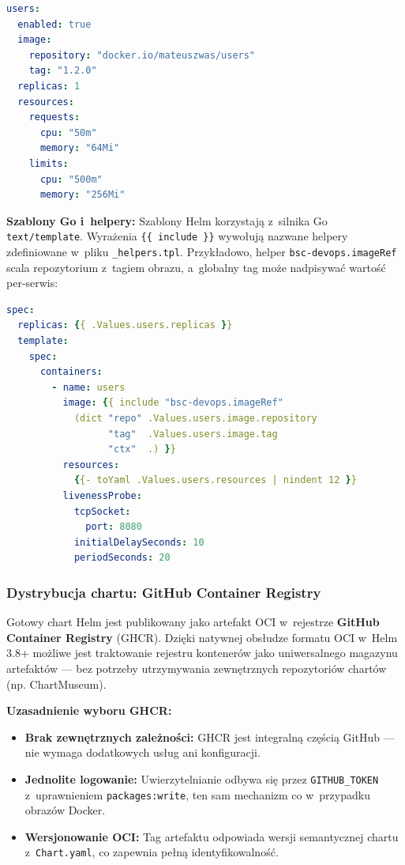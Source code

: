 \begin{lstlisting}[language=yaml, caption={Fragment \texttt{values.yaml} umbrella chartu --- parametryzacja serwisu \textit{users} (infrastructure/helm/bsc-devops/values.yaml)}, label={lst:helm-values}]
users:
  enabled: true
  image:
    repository: "docker.io/mateuszwas/users"
    tag: "1.2.0"
  replicas: 1
  resources:
    requests:
      cpu: "50m"
      memory: "64Mi"
    limits:
      cpu: "500m"
      memory: "256Mi"
\end{lstlisting}

\textbf{Szablony Go i~helpery:}
Szablony Helm korzystają z~silnika Go \texttt{text/template}. Wyrażenia \texttt{\{\{ include \}\}} wywołują nazwane helpery zdefiniowane w~pliku \texttt{\_helpers.tpl}. Przykładowo, helper \texttt{bsc-devops.imageRef} scala repozytorium z~tagiem obrazu, a~globalny tag może nadpisywać wartość per-serwis:

\begin{lstlisting}[language=yaml, caption={Fragment szablonu Deployment serwisu \textit{users} z~interpolacją wartości (infrastructure/helm/bsc-devops/templates/users.yaml)}, label={lst:helm-template}]
spec:
  replicas: {{ .Values.users.replicas }}
  template:
    spec:
      containers:
        - name: users
          image: {{ include "bsc-devops.imageRef"
            (dict "repo" .Values.users.image.repository
                  "tag"  .Values.users.image.tag
                  "ctx"  .) }}
          resources:
            {{- toYaml .Values.users.resources | nindent 12 }}
          livenessProbe:
            tcpSocket:
              port: 8080
            initialDelaySeconds: 10
            periodSeconds: 20
\end{lstlisting}

\subsubsection{Dystrybucja chartu: GitHub Container Registry}
Gotowy chart Helm jest publikowany jako artefakt OCI w~rejestrze \textbf{GitHub Container Registry} (GHCR). Dzięki natywnej obsłudze formatu OCI w~Helm 3.8+ możliwe jest traktowanie rejestru kontenerów jako uniwersalnego magazynu artefaktów --- bez potrzeby utrzymywania zewnętrznych repozytoriów chartów (np. ChartMuseum).

\textbf{Uzasadnienie wyboru GHCR:}
\begin{itemize}
    \item \textbf{Brak zewnętrznych zależności:} GHCR jest integralną częścią GitHub --- nie wymaga dodatkowych usług ani konfiguracji.
    \item \textbf{Jednolite logowanie:} Uwierzytelnianie odbywa się przez \texttt{GITHUB\_TOKEN} z~uprawnieniem \texttt{packages:write}, ten sam mechanizm co w~przypadku obrazów Docker.
    \item \textbf{Wersjonowanie OCI:} Tag artefaktu odpowiada wersji semantycznej chartu z~\texttt{Chart.yaml}, co zapewnia pełną identyfikowalność.
\end{itemize}

